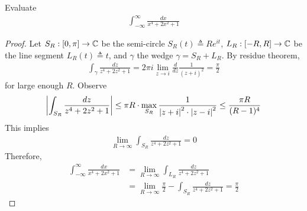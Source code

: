 \documentclass{report}
\begin{document}
\begin{question}{}{}
Evaluate 
\begin{align*}
\int_{-\infty}^{\infty} \frac{dx}{x^4+2x^2+1}
\end{align*}
\end{question}
\begin{proof}
Let $S_R:[0 ,\pi ]\rightarrow \mathbb{C}$ be the semi-circle $S_R(t)\triangleq Re^{it}$, $L_R:[-R,R]\rightarrow \mathbb{C}$ be the line segment $L_R(t)\triangleq t$, and $\gamma$ the wedge $\gamma =S_R+L_R$. By residue theorem, 
\begin{align*}
\int_{\gamma } \frac{dz}{z^4+2z^2+1}= 2\pi  i \lim_{z\to i} \frac{d}{dz} \frac{1}{(z+i)^2}= \frac{\pi }{2}
\end{align*}
for large enough $R$. Observe 
 \begin{align*}
\left|\int_{S_R} \frac{dz}{z^4+2z^2+1}\right|\leq \pi  R \cdot \max_{S_R} \frac{1}{\left|z+i\right|^2 \cdot \left|z-i\right|^2}\leq \frac{\pi  R}{(R-1)^4}
\end{align*}
This implies 
\begin{align*}
\lim_{R\to \infty} \int_{S_R} \frac{dz}{z^4+2z^2+1} = 0
\end{align*}
Therefore, 
\begin{align*}
\int_{-\infty}^{\infty} \frac{dx}{x^4+ 2x^2+1}&= \lim_{R\to \infty} \int_{L_R} \frac{dz}{z^4+2z^2+1} \\
&=\lim_{R\to \infty} \frac{\pi }{2}- \int_{S_R} \frac{dz}{z^4+2z^2+1}= \frac{\pi }{2}
\end{align*}
\end{proof}
\end{document}
